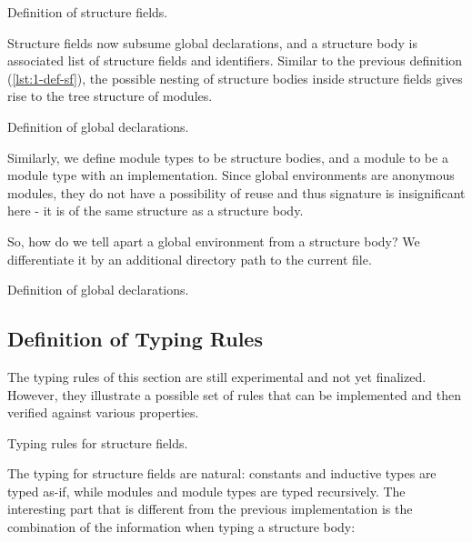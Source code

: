 \begin{listing}[H]
  \caption{Definition of structure fields.}
  \label{lst:2-def-sf}
\end{listing}

Structure fields now subsume global declarations, and a structure body is
associated list of structure fields and identifiers. Similar to the previous
definition (\ref{lst:1-def-sf}), the possible nesting of structure bodies inside
structure fields gives rise to the tree structure of modules.

\begin{listing}[H]
  \caption{Definition of global declarations.}
  \label{lst:2-def-gd}
\end{listing}

Similarly, we define module types to be structure bodies, and a module to be a
module type with an implementation. Since global environments are anonymous
modules, they do not have a possibility of reuse and thus signature is
insignificant here - it is of the same structure as a structure body.

So, how do we tell apart a global environment from a structure body? We
differentiate it by an additional directory path to the current file.

\begin{listing}[H]
  \caption{Definition of global declarations.}
  \label{lst:2-def-env}
\end{listing}

\subsection{Definition of Typing Rules}
The typing rules of this section are still experimental and not yet finalized.
However, they illustrate a possible set of rules that can be implemented and
then verified against various properties.

\begin{listing}[H]
  \caption{Typing rules for structure fields.}
  \label{lst:2-typing-sf}
\end{listing}

The typing for structure fields are natural: constants and inductive types are
typed as-if, while modules and module types are typed recursively. The
interesting part that is different from the previous implementation is the
combination of the information when typing a structure body:

